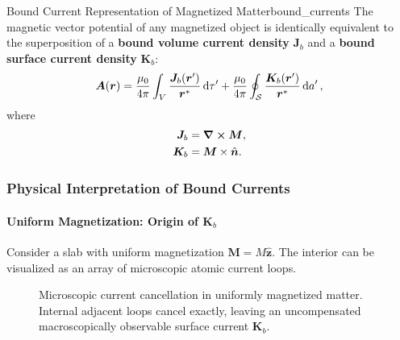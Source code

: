 \begin{theorem}{Bound Current Representation of Magnetized Matter}{bound_currents}
    The magnetic vector potential of any magnetized object is identically equivalent to the superposition of a \textbf{bound volume current density} $\bm{J}_b$ and a \textbf{bound surface current density} $\bm{K}_b$:
    \begin{equation}
        \bm{A}(\bm{r}) = \frac{\mu_0}{4\pi} \int_V \frac{\bm{J}_b(\bm{r}')}{\bm{r}^*} \dd{\tau'} + \frac{\mu_0}{4\pi} \oint_{\mathcal{S}} \frac{\bm{K}_b(\bm{r}')}{\bm{r}^*} \dd{a'},
    \end{equation}
    where
    \begin{align}
        \bm{J}_b &= \curl \bm{M}, \label{eq:J_bound} \\
        \bm{K}_b &= \bm{M} \times \hat{\bm{n}}. \label{eq:K_bound}
    \end{align}
\end{theorem}

\subsubsection{Physical Interpretation of Bound Currents}

\paragraph{Uniform Magnetization: Origin of $\bm{K}_b$}

Consider a slab with uniform magnetization $\bm{M} = M \hat{\bm{z}}$. The interior can be visualized as an array of microscopic atomic current loops.

\begin{figure}[htbp]
    \centering
    \caption{Microscopic current cancellation in uniformly magnetized matter. Internal adjacent loops cancel exactly, leaving an uncompensated macroscopically observable surface current $\bm{K}_b$.}
    \label{fig:bound_surface_current}
\end{figure}

